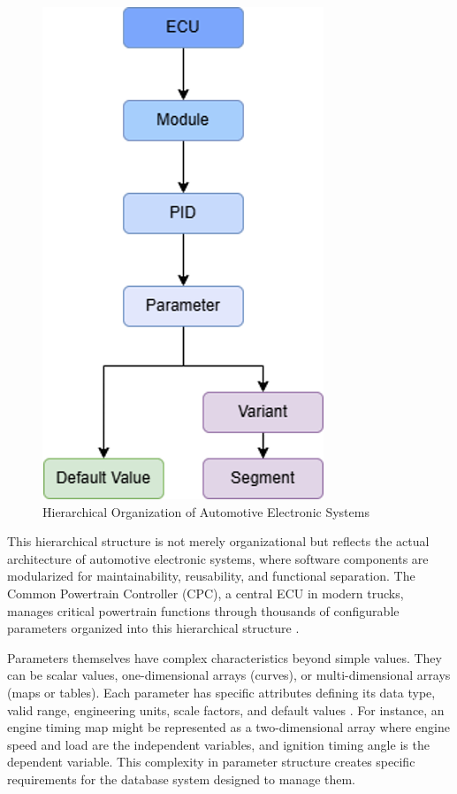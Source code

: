 \begin{figure}[ht]
    \centering
    \includegraphics[height=0.4\textheight]{figures/ecu_hierarchy.png}
    \caption{Hierarchical Organization of Automotive Electronic Systems}
    \label{fig:ecu-hierarchy}
\end{figure}

This hierarchical structure is not merely organizational but reflects the actual architecture of automotive electronic systems, where software components are modularized for maintainability, reusability, and functional separation. The Common Powertrain Controller (\ac{CPC}), a central \ac{ECU} in modern trucks, manages critical powertrain functions through thousands of configurable parameters organized into this hierarchical structure \cite{staron2021automotive}.

Parameters themselves have complex characteristics beyond simple values. They can be scalar values, one-dimensional arrays (curves), or multi-dimensional arrays (maps or tables). Each parameter has specific attributes defining its data type, valid range, engineering units, scale factors, and default values \cite{pretschner2007software}. For instance, an engine timing map might be represented as a two-dimensional array where engine speed and load are the independent variables, and ignition timing angle is the dependent variable. This complexity in parameter structure creates specific requirements for the database system designed to manage them.

